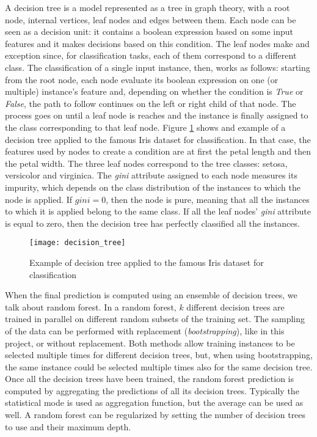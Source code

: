 A decision tree is a model represented as a tree in graph theory, with a root node, internal vertices, leaf nodes and edges between them. Each node can be seen as a decision unit: it contains a boolean expression based on some input features and it makes decisions based on this condition. The leaf nodes make and exception since, for classification tasks, each of them correspond to a different class. The classification of a single input instance, then, works as follows: starting from the root node, each node evaluate its boolean expression on one (or multiple) instance's feature and, depending on whether the condition is \textit{True} or \textit{False}, the path to follow continues on the left or right child of that node. The process goes on until a leaf node is reaches and the instance is finally assigned to the class corresponding to that leaf node. Figure \ref{fig:decision_tree} shows and example of a decision tree applied to the famous Iris dataset for classification. In that case, the features used by nodes to create a condition are at first the petal length and then the petal width. The three leaf nodes correspond to the tree classes: setosa, versicolor and virginica. The \textit{gini} attribute assigned to each node measures its impurity, which depends on the class distribution of the instances to which the node is applied. If $gini = 0$, then the node is pure, meaning that all the instances to which it is applied belong to the same class. If all the leaf nodes' \textit{gini} attribute is equal to zero, then the decision tree has perfectly classified all the instances.
\begin{figure}[htbp]
    \centering
    \texttt{[image: decision\_tree]}
    \caption{Example of decision tree applied to the famous Iris dataset for classification}
    \label{fig:decision_tree}
\end{figure}

When the final prediction is computed using an ensemble of decision trees, we talk about random forest. In a random forest, $k$ different decision trees are trained in parallel on different random subsets of the training set. The sampling of the data can be performed with replacement (\textit{bootstrapping}), like in this project, or without replacement. Both methods allow training instances to be selected multiple times for different decision trees, but, when using bootstrapping, the same instance could be selected multiple times also for the same decision tree. Once all the decision trees have been trained, the random forest prediction is computed by aggregating the predictions of all its decision trees. Typically the statistical mode is used as aggregation function, but the average can be used as well. A random forest can be regularized by setting the number of decision trees to use and their maximum depth.

